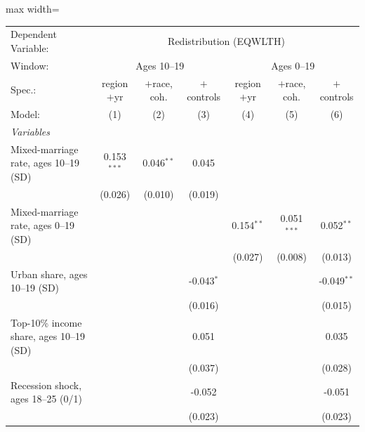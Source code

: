       \begin{adjustbox}{max width=\linewidth}
   \begin{tabular}{lcccccc}
      \tabularnewline \midrule \midrule
      Dependent Variable: & \multicolumn{6}{c}{Redistribution (EQWLTH)}\\
      Window: & \multicolumn{3}{c}{Ages 10--19} & \multicolumn{3}{c}{Ages 0--19} \\ 
      Spec.:                                   & region$+$yr   & $+$race, coh. & $+$controls  & region$+$yr  & $+$race, coh. & $+$controls \\   
      Model:                                   & (1)           & (2)           & (3)          & (4)          & (5)           & (6)\\  
      \midrule
      \emph{Variables}\\
      Mixed-marriage rate, ages 10--19 (SD)    & 0.153$^{***}$ & 0.046$^{**}$  & 0.045        &              &               &   \\   
                                               & (0.026)       & (0.010)       & (0.019)      &              &               &   \\   
      Mixed-marriage rate, ages 0--19 (SD)     &               &               &              & 0.154$^{**}$ & 0.051$^{***}$ & 0.052$^{**}$\\   
                                               &               &               &              & (0.027)      & (0.008)       & (0.013)\\   
      Urban share, ages 10--19 (SD)            &               &               & -0.043$^{*}$ &              &               & -0.049$^{**}$\\   
                                               &               &               & (0.016)      &              &               & (0.015)\\   
      Top-10\% income share, ages 10--19 (SD)  &               &               & 0.051        &              &               & 0.035\\   
                                               &               &               & (0.037)      &              &               & (0.028)\\   
      Recession shock, ages 18--25 (0/1)       &               &               & -0.052       &              &               & -0.051\\   
                                               &               &               & (0.023)      &              &               & (0.023)\\   

\end{tabular}
\end{adjustbox}
